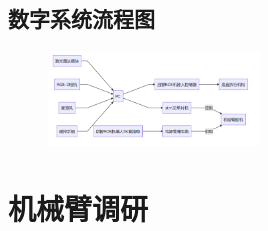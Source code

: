\documentclass[11pt]{article}
\begin{document}
\subsection{数字系统流程图}
\begin{figure}[H] %
    \centering %
    \includegraphics[width=0.5\textwidth]{18.PNG} %
\end{figure}
\section{机械臂调研}
\end{document}
